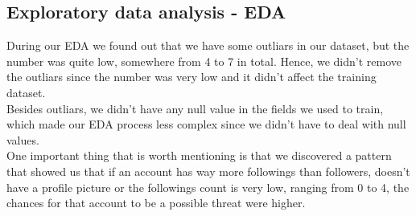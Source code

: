 \subsection{Exploratory data analysis - EDA}
During our EDA we found out that we have some outliars in our dataset, but the number was quite low, somewhere from 4 to 7
in total. Hence, we didn't remove the outliars since the number was very low and it didn't affect the training dataset.
\\[5pt]
Besides outliars, we didn't have any null value in the fields we used to train, which made our EDA process less complex
since we didn't have to deal with null values.
\\[5pt]
One important thing that is worth mentioning is that we discovered a pattern that showed us that if an account has
way more followings than followers, doesn't have a profile picture or the followings count is very low, ranging from 0 to 4, the
chances for that account to be a possible threat were higher.
